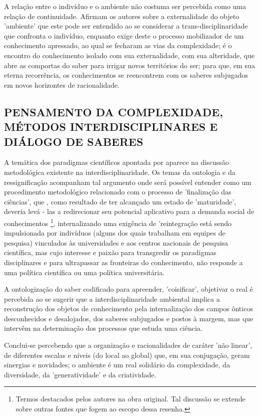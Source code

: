 \documentclass[
   article,       %
   12pt,          %
   oneside,       %
   a4paper,       %
   english,       %
   brazil,           %
   sumario=tradicional
   ]{abntex2}
\begin{document}
A relação entre o indivíduo e o ambiente não costuma ser percebida como uma relação de continuidade. Afirmam os autores sobre a externalidade do objeto 'ambiente' que este pode ser entendido ao se considerar a trans-disciplinaridade que confronta o indivíduo, enquanto exige deste o processo mobilizador de um conhecimento apressado, ao qual se fecharam as vias da complexidade; é o encontro do conhecimento isolado com sua externalidade, com sua alteridade, que abre as comportas do saber para irrigar novos territórios do ser; para que, em sua eterna recorrência, os conhecimentos se reencontrem com os saberes subjugados em novos horizontes de racionalidade.

\subsection{PENSAMENTO DA COMPLEXIDADE, MÉTODOS
INTERDISCIPLINARES E DIÁLOGO DE SABERES}


A temática dos paradigmas científicos apontada por \cite{Kuhn2012-oa} aparece na discussão metodológica existente na interdisciplinaridade. Os temas da ontologia e da ressignificação acompanham tal argumento onde será possível entender como um procedimento metodológico relacionado com o processo de 'finalização das ciências', que , como resultado de ter alcançado um estado de 'maturidade', deveria levá - las a redirecionar seu potencial aplicativo para a demanda social de conhecimentos \footnote{Termos destacados pelos autores na obra original. Tal discussão se extende sobre outras fontes que fogem ao escopo dessa resenha.}, internalizando uma exigência de 'reintegração está sendo impulsionada por indivíduos (alguns dos quais trabalham em equipes de pesquisa) vinculados às universidades e aos centros nacionais de pesquisa científica, mas cujo interesse e paixão para transgredir os paradigmas disciplinares e para ultrapassar as fronteiras do conhecimento, não responde a uma política científica ou uma política universitária. 

A ontologização do saber codificado para apreender, 'coisificar', objetivar o real é percebida ao se sugerir que a interdisciplinaridade ambiental implica a reconstrução dos objetos de conhecimento pela internalização dos campos ônticos desconhecidos e desalojados, dos saberes subjugados e postos à margem, mas que intervêm na determinação dos processos que estuda uma ciência. 

Conclui-se percebendo que a organização e racionalidades de caráter 'não linear', de diferentes escalas e níveis (do local ao global) que, em sua conjugação, geram sinergias e novidades; o ambiente é um real solidário da complexidade, da diversidade, da 'generatividade' e da criatividade.
\end{document}
